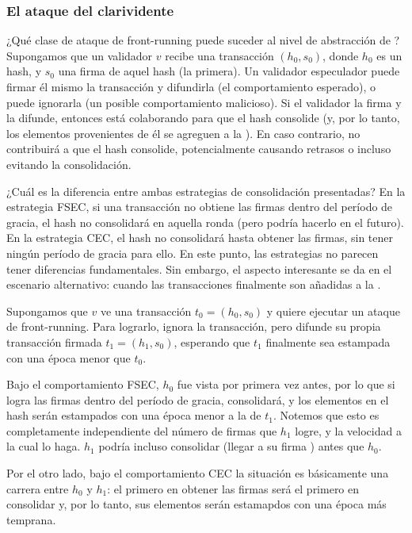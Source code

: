 \subsubsection{El ataque del clarividente}
¿Qué clase de ataque de front-running puede suceder al nivel de abstracción de \hashchain?
Supongamos que un validador $v$ recibe una transacción $(h_0, s_0)$, donde $h_0$ es un hash,
y $s_0$ una firma de aquel hash (la primera). Un validador especulador puede firmar él mismo la
transacción y difundirla (el comportamiento esperado), o puede ignorarla (un posible comportamiento
malicioso). Si el validador la firma y la difunde, entonces está colaborando para que el hash
consolide (y, por lo tanto, los elementos provenientes de él se agreguen a la  \setchain).
En caso contrario, no contribuirá a que el hash consolide, potencialmente causando retrasos
o incluso evitando la consolidación.
%

¿Cuál es la diferencia entre ambas estrategias de consolidación presentadas?
%
En la estrategia FSEC, si una transacción no obtiene las \SPH firmas
dentro del período de gracia, el hash no consolidará en aquella ronda (pero podría hacerlo
en el futuro).
%
En la estrategia CEC, el hash no consolidará hasta obtener las \SPH firmas,
sin tener ningún período de gracia para ello.
%
En este punto, las estrategias no parecen tener diferencias fundamentales. Sin embargo, el aspecto
interesante se da en el escenario alternativo: cuando las transacciones finalmente son añadidas a la
\setchain.
%

Supongamos que $v$ ve una transacción $t_0 = (h_0, s_0)$ y quiere ejecutar un ataque de front-running.
Para lograrlo, ignora la transacción, pero difunde su propia transacción firmada $t_1 = (h_1, s_0)$,
esperando que $t_1$ finalmente sea estampada con una época menor que $t_0$.
%

Bajo el comportamiento FSEC, $h_0$ fue vista por primera vez antes, por lo que si logra las
\SPH firmas dentro del período de gracia, consolidará, y los elementos
en el hash serán estampados con una época menor a la de $t_1$.
%
Notemos que esto es completamente independiente del número de firmas que $h_1$ logre, y la velocidad
a la cual lo haga. $h_1$ podría incluso consolidar (llegar a su firma \SPH)
antes que $h_0$.
%

Por el otro lado, bajo el comportamiento CEC la situación es básicamente una carrera entre $h_0$ y
$h_1$: el primero en obtener las \SPH firmas será el primero en consolidar y,
por lo tanto, sus elementos serán estamapdos con una época más temprana.
%

